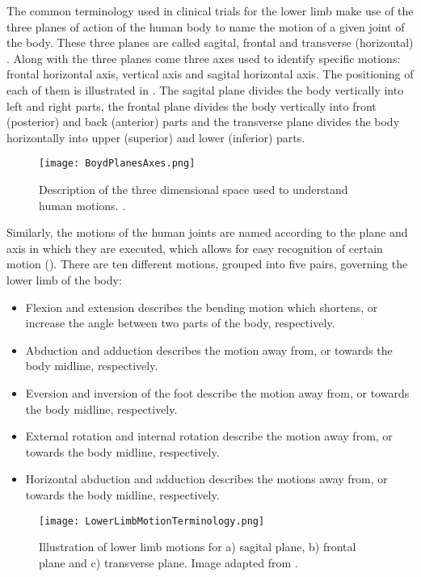 The common terminology used in clinical trials for the lower limb make use of the three planes of action of the human body to name the motion of a given joint of the body. These three planes are called sagital, frontal and transverse (horizontal) \cite{PhysicalSolutions2016}. Along with the three planes come three axes used to identify specific motions: frontal horizontal axis, vertical axis and sagital horizontal axis. The positioning of each of them is illustrated in . The sagital plane divides the body vertically into left and right parts, the frontal plane divides the body vertically into front (posterior) and back (anterior) parts and the transverse plane divides the body horizontally into upper (superior) and lower (inferior) parts.

\begin{figure}[htbp!]
    \centering
    \texttt{[image: BoydPlanesAxes.png]}
    \caption{Description of the three dimensional space used to understand human motions. \cite{PhysicalSolutions2016}. }
    \label{fig:body_planes_axes}
\end{figure}

Similarly, the motions of the human joints are named according to the plane and axis in which they are executed, which allows for easy recognition of certain motion (). There are ten different motions, grouped into five pairs, governing the lower limb of the body:
\begin{itemize}
    \item Flexion and extension describes the bending motion which shortens, or increase the angle between two parts of the body, respectively.
    \item Abduction and adduction describes the motion away from, or towards the body midline, respectively.
    \item Eversion and inversion of the foot describe the motion away from, or towards the body midline, respectively.
    \item External rotation and internal rotation describe the motion away from, or towards the body midline, respectively.
    \item Horizontal abduction and adduction describes the motions away from, or towards the body midline, respectively.
\end{itemize}

\begin{figure}[htbp!]
    \centering
    \texttt{[image: LowerLimbMotionTerminology.png]}
    \caption{Illustration of lower limb motions for a) sagital plane, b) frontal plane and c) transverse plane. Image adapted from  \cite{PhysicalSolutions2016}. }
    \label{fig:lower_motion}
\end{figure}

